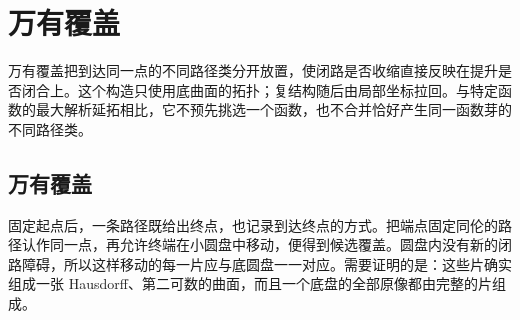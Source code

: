 \section{万有覆盖}
\label{b3:sec:1103}

万有覆盖把到达同一点的不同路径类分开放置，使闭路是否收缩直接反映在提升是否闭合上。这个构造只使用底曲面的拓扑；复结构随后由局部坐标拉回。与特定函数的最大解析延拓相比，它不预先挑选一个函数，也不合并恰好产生同一函数芽的不同路径类。

\subsection{万有覆盖}
\label{b3:subsec:110301}

固定起点后，一条路径既给出终点，也记录到达终点的方式。把端点固定同伦的路径认作同一点，再允许终端在小圆盘中移动，便得到候选覆盖。圆盘内没有新的闭路障碍，所以这样移动的每一片应与底圆盘一一对应。需要证明的是：这些片确实组成一张 Hausdorff、第二可数的曲面，而且一个底盘的全部原像都由完整的片组成。

